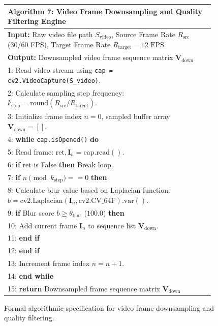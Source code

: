 \begin{figure}[htbp]
\centering
\begin{minipage}{0.92\textwidth}
\small
\setlength{\extrarowheight}{2pt}
\begin{tabular}{|p{0.96\linewidth}|}
\hline
\textbf{Algorithm 7: Video Frame Downsampling and Quality Filtering Engine} \\
\hline
{\small\sffamily \textbf{Input:} Raw video file path $S_{\text{video}}$, Source Frame Rate $R_{\text{src}}$ (30/60 FPS), Target Frame Rate $R_{\text{target}} = 12\text{ FPS}$} \\
{\small\sffamily \textbf{Output:} Downsampled video frame sequence matrix $\mathbf{V}_{\text{down}}$} \\
{\small 1: Read video stream using \texttt{cap = cv2.VideoCapture(S\_video)}.} \\
{\small 2: Calculate sampling step frequency: $k_{\text{step}} = \text{round}(R_{\text{src}} / R_{\text{target}})$.} \\
{\small 3: Initialize frame index $n = 0$, sampled buffer array $\mathbf{V}_{\text{down}} = []$.} \\
{\small 4: \textbf{while} \texttt{cap.isOpened()} \textbf{do}} \\
{\small 5: \hspace{1em} Read frame: $\text{ret}, \mathbf{I}_n = \text{cap.read}()$.} \\
{\small 6: \hspace{1em} \textbf{if} $\text{ret}$ is False \textbf{then} Break loop.} \\
{\small 7: \hspace{1em} \textbf{if} $n \pmod{k_{\text{step}}} == 0$ \textbf{then}} \\
{\small 8: \hspace{2em} Calculate blur value based on Laplacian function: $b = \text{cv2.Laplacian}(\mathbf{I}_n, \text{cv2.CV\_64F}).\text{var}()$.} \\
{\small 9: \hspace{2em} \textbf{if} Blur score $b \ge \theta_{\text{blur}}$ ($100.0$) \textbf{then}} \\
{\small 10: \hspace{2em} \hspace{1em} Add current frame $\mathbf{I}_n$ to sequence list $\mathbf{V}_{\text{down}}$.} \\
{\small 11: \hspace{2em} \textbf{end if}} \\
{\small 12: \hspace{1em} \textbf{end if}} \\
{\small 13: \hspace{1em} Increment frame index $n = n + 1$.} \\
{\small 14: \textbf{end while}} \\
{\small 15: \textbf{return} Downsampled frame sequence matrix $\mathbf{V}_{\text{down}}$} \\
\hline
\end{tabular}
\end{minipage}
\caption{Formal algorithmic specification for video frame downsampling and quality filtering.}
\label{alg:resample_12fps}
\end{figure}

